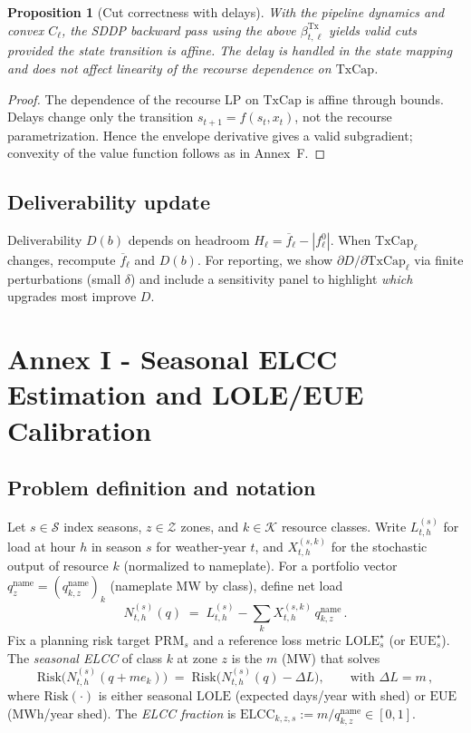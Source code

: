 \documentclass[11pt]{article}
\numberwithin{equation}{section}
\newtheorem{proposition}{Proposition}[section]
\theoremstyle{definition}
\theoremstyle{remark}
\begin{document}
\begin{proposition}[Cut correctness with delays]
With the pipeline dynamics and convex $C_\ell$, the SDDP backward pass using the above $\beta_{t,\ell}^{\mathrm{Tx}}$ yields valid cuts provided the state transition is affine. The delay is handled in the state mapping and does not affect linearity of the recourse dependence on $\mathrm{TxCap}$.
\end{proposition}

\begin{proof}
The dependence of the recourse LP on $\mathrm{TxCap}$ is affine through bounds. Delays change only the transition $s_{t+1}=f(s_t,x_t)$, not the recourse parametrization. Hence the envelope derivative gives a valid subgradient; convexity of the value function follows as in Annex~F. 
\end{proof}

\subsection{ Deliverability update}
Deliverability $D(b)$ depends on headroom $H_\ell=\overline f_\ell-|f^0_\ell|$. When $\mathrm{TxCap}_\ell$ changes, recompute $\overline f_\ell$ and $D(b)$. For reporting, we show $\partial D/\partial \mathrm{TxCap}_\ell$ via finite perturbations (small $\delta$) and include a sensitivity panel to highlight \emph{which} upgrades most improve $D$.


\section{Annex I - Seasonal ELCC Estimation and LOLE/EUE Calibration}
\label{annex:I}

\subsection{ Problem definition and notation}
Let $s\in\mathcal{S}$ index seasons, $z\in\mathcal{Z}$ zones, and $k\in\mathcal{K}$ resource classes.
Write $L_{t,h}^{(s)}$ for load at hour $h$ in season $s$ for weather-year $t$, and $X_{t,h}^{(s,k)}$ for the stochastic output of resource $k$ (normalized to nameplate). For a portfolio vector $q_{z}^{\text{name}} = (q^{\text{name}}_{k,z})_k$ (nameplate MW by class), define net load
\[
N_{t,h}^{(s)}(q) \;=\; L_{t,h}^{(s)} - \sum_{k} X_{t,h}^{(s,k)}\,q^{\text{name}}_{k,z}\,.
\]
Fix a planning risk target $\mathrm{PRM}_s$ and a reference loss metric $\mathrm{LOLE}^{\star}_s$ (or $\mathrm{EUE}^{\star}_s$). The \emph{seasonal ELCC} of class $k$ at zone $z$ is the $m$ (MW) that solves
\begin{equation}
  \mathrm{Risk}\!\big(N_{t,h}^{(s)}(q + m e_k)\big)
  \;=\; \mathrm{Risk}\!\big(N_{t,h}^{(s)}(q) - \Delta L\big), 
  \qquad \text{with }\Delta L = m\,,
  \label{eq:J_ELCC_def}
\end{equation}
where $\mathrm{Risk}(\cdot)$ is either seasonal $\mathrm{LOLE}$ (expected days/year with shed) or $\mathrm{EUE}$ (MWh/year shed). The \emph{ELCC fraction} is $\mathrm{ELCC}_{k,z,s} := m/q_{k,z}^{\text{name}}\in[0,1]$.
\end{document}
